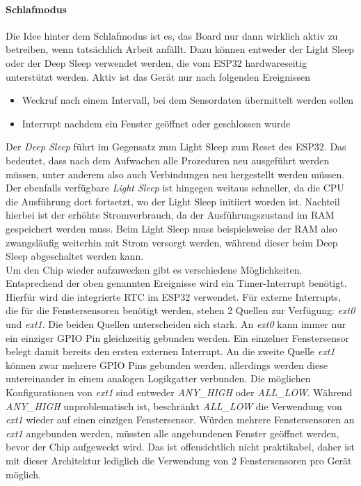 \documentclass[a4paper,10pt,twocolumn]{article}
\begin{document}
\paragraph{Schlafmodus} Die Idee hinter dem Schlafmodus ist es, das Board nur dann wirklich aktiv zu betreiben, wenn tatsächlich Arbeit anfällt. Dazu können entweder der Light Sleep oder der Deep Sleep verwendet werden, die vom ESP32 hardwareseitig unterstützt werden. Aktiv ist das Gerät nur nach folgenden Ereignissen
\begin{itemize}
    \item Weckruf nach einem Intervall, bei dem Sensordaten übermittelt werden sollen
    \item Interrupt nachdem ein Fenster geöffnet oder geschlossen wurde
\end{itemize}
Der \textit{Deep Sleep} \cite{ESPDeepSleep} führt im Gegensatz zum Light Sleep zum Reset des ESP32. Das bedeutet, dass nach dem Aufwachen alle Prozeduren neu ausgeführt werden müssen, unter anderem also auch Verbindungen neu hergestellt werden müssen. Der ebenfalls verfügbare \textit{Light Sleep} \cite{ESPSleepModes} ist hingegen weitaus schneller, da die CPU die Ausführung dort fortsetzt, wo der Light Sleep initiiert worden ist. Nachteil hierbei ist der erhöhte Stromverbrauch, da der Ausführungszustand im \ac{RAM} gespeichert werden muss. Beim Light Sleep muss beispielsweise der \ac{RAM} also zwangsläufig weiterhin mit Strom versorgt werden, während dieser beim Deep Sleep abgeschaltet werden kann.\\
Um den Chip wieder aufzuwecken gibt es verschiedene Möglichkeiten. Entsprechend der oben genannten Ereignisse wird ein Timer-Interrupt benötigt. Hierfür wird die integrierte RTC im ESP32 verwendet. Für externe Interrupts, die für die Fenstersensoren benötigt werden, stehen 2 Quellen zur Verfügung: \textit{ext0} und \textit{ext1}. Die beiden Quellen unterscheiden sich stark. An \textit{ext0} kann immer nur ein einziger GPIO Pin gleichzeitig gebunden werden. Ein einzelner Fenstersensor belegt damit bereits den ersten externen Interrupt. An die zweite Quelle \textit{ext1} können zwar mehrere GPIO Pins gebunden werden, allerdings werden diese untereinander in einem analogen Logikgatter verbunden. Die möglichen Konfigurationen von \textit{ext1} sind entweder \textit{ANY\_HIGH} oder \textit{ALL\_LOW}. Während \textit{ANY\_HIGH} unproblematisch ist, beschränkt \textit{ALL\_LOW} die Verwendung von \textit{ext1} wieder auf einen einzigen Fenstersensor. Würden mehrere Fenstersensoren an \textit{ext1} angebunden werden, müssten alle angebundenen Fenster geöffnet werden, bevor der Chip aufgeweckt wird. Das ist offensichtlich nicht praktikabel, daher ist mit dieser Architektur lediglich die Verwendung von 2 Fenstersensoren pro Gerät möglich.
\end{document}

